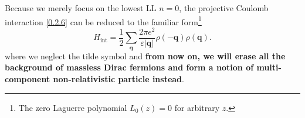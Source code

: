 \documentclass[bachelor,english,numbers]{ustcthesis}
\begin{document}
			Because we merely focus on the lowest LL $n=0$, the projective Coulomb interaction \eqref{0.2.6} can be reduced to the familiar form\footnote{The zero Laguerre polynomial $L_0(z)=0$ for arbitrary $z$.}
			\begin{equation}\label{0.2.7}
				H_{\text{int}}=\dfrac{1}{2}\sum_{\bm{q}}\dfrac{2\pi e^2}{\varepsilon|\bm{q}|}\rho(\bm{-q})\rho(\bm{q}).
			\end{equation}
			where we neglect the tilde symbol and {\bf from now on, we will erase all the background of massless Dirac fermions and form a notion of multi-component non-relativistic particle instead}.
\end{document}
